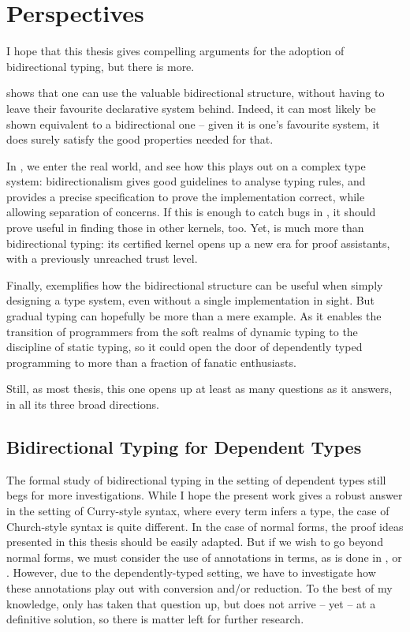 \chapter{Perspectives}
\label{chap:future-work}

I hope that this thesis gives compelling arguments for the adoption of bidirectional typing,
but there is more.

 shows that one can use the valuable bidirectional structure,
without having to  leave their favourite declarative
system behind. Indeed, it can most likely  be shown equivalent to a bidirectional one
– given it is one’s favourite system, it does surely satisfy the good properties
needed for that.

In , we enter the real world, and see how this plays out
on a complex type system: bidirectionalism gives good guidelines to analyse
typing rules, and provides a precise specification to prove the implementation correct,
while allowing separation of concerns. If this is enough
to catch bugs in , it should prove useful in finding those in other kernels, too.
Yet,  is much more than bidirectional typing: its certified kernel opens
up a new era for proof assistants, with a previously unreached trust level.

Finally,
 exemplifies how the bidirectional structure can be useful when
simply designing a type system, even without a single implementation in sight.
But gradual typing can hopefully be more than a mere
example. As it enables the transition of programmers from the soft realms of
dynamic typing to the discipline of static typing, so it could open the door of
dependently typed programming to more than a fraction of fanatic enthusiasts.

Still, as most thesis, this one opens up at least as many questions as it answers,
in all its three broad directions.

\section{Bidirectional Typing for Dependent Types}

The formal study of bidirectional typing in the setting of dependent types still begs for
more investigations. While I hope the present work gives a robust answer in the setting
of Curry-style syntax, where every term infers a type,
the case of Church-style syntax is quite different. In the case of normal forms,
the proof ideas presented in this thesis should be easily adapted.
But if we wish to go beyond normal forms, we must consider the use of annotations in terms,
as is done in \eg {},  or
.
However, due to the dependently-typed
setting, we have to investigate how these annotations play out with conversion and/or reduction.
To the best of my knowledge, only \citeauthor{McBride2022} has taken that question up,
but does not arrive – yet – at a definitive solution, so there is
matter left for further research.

